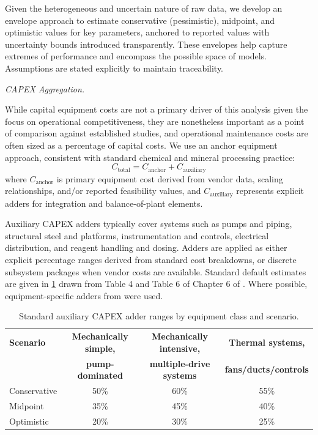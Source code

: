Given the heterogeneous and uncertain nature of raw data, we develop an envelope approach to estimate conservative (pessimistic), midpoint, and optimistic values for key parameters, anchored to reported values with uncertainty bounds introduced transparently. These envelopes help capture extremes of performance and encompass the possible space of models. Assumptions are stated explicitly to maintain traceability.

\medskip
\noindent\textit{CAPEX Aggregation.}\quad

While capital equipment costs are not a primary driver of this analysis given the focus on operational competitiveness, they are nonetheless important as a point of comparison against established studies, and operational maintenance costs are often sized as a percentage of capital costs. We use an anchor equipment approach, consistent with standard chemical and mineral processing practice:
\begin{equation}
    C_{\text{total}} = C_{\text{anchor}} + C_{\text{auxiliary}}
\end{equation}
where $C_{\text{anchor}}$ is primary equipment cost derived from vendor data, scaling relationships, and/or reported feasibility values, and $C_{\text{auxiliary}}$ represents explicit adders for integration and balance-of-plant elements.

Auxiliary CAPEX adders typically cover systems such as pumps and piping, structural steel and platforms, instrumentation and controls, electrical distribution, and reagent handling and dosing. Adders are applied as either explicit percentage ranges derived from standard cost breakdowns, or discrete subsystem packages when vendor costs are available. Standard default estimates are given in \ref{tab:c-capex-adders} drawn from Table 4 and Table 6 of Chapter 6 of \citet{petersPlantDesignEconomics1991}. Where possible, equipment-specific adders from \citet{petersPlantDesignEconomics1991} were used. 

\begin{table}[h]
\centering
\caption{Standard auxiliary CAPEX adder ranges by equipment class and scenario.}
\label{tab:c-capex-adders}
\begin{tabular}{lccc}
\hline
\textbf{Scenario} & \textbf{Mechanically simple,} & \textbf{Mechanically intensive,} & \textbf{Thermal systems,} \\
                  & \textbf{pump-dominated}       & \textbf{multiple-drive systems}  & \textbf{fans/ducts/controls} \\
\hline
Conservative & 50\% & 60\% & 55\% \\
Midpoint     & 35\% & 45\% & 40\% \\
Optimistic   & 20\% & 30\% & 25\% \\
\hline
\end{tabular}
\end{table}

